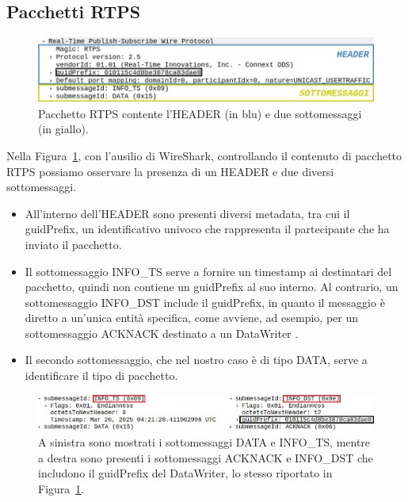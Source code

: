 \subsection{Pacchetti RTPS}


\begin{figure}[H]
    \centering
    \includegraphics[width=15.2cm, keepaspectratio]{img/Header e sottomessaggi esempio shapes2.jpg}
    \caption{Pacchetto RTPS contente l'HEADER (in blu) e due sottomessaggi (in giallo).}
    \label{headersubmessagedemo}
\end{figure}



Nella Figura~\ref{headersubmessagedemo}, con l'ausilio di WireShark,
controllando il contenuto di pacchetto RTPS possiamo osservare la presenza
di un HEADER e due diversi sottomessaggi. 
\begin{itemize}
    \item All'interno dell'HEADER sono presenti
    diversi metadata, tra cui il guidPrefix, un identificativo univoco che rappresenta
    il partecipante che ha inviato il pacchetto.
    \item Il sottomessaggio INFO\_TS serve a fornire un timestamp ai destinatari 
    del pacchetto,
    quindi non contiene un guidPrefix al 
    suo interno. Al contrario, un sottomessaggio INFO\_DST include
    il guidPrefix, in quanto il messaggio è diretto a un'unica
    entità specifica, come avviene, ad esempio, per un sottomessaggio ACKNACK
    destinato a un DataWriter \cite{rtiwireshark}.
    \item Il secondo sottomessaggio, che nel nostro caso è di tipo DATA,
    serve a identificare il tipo di pacchetto.
\end{itemize}
\begin{figure}[H]
    \centering
    \includegraphics[width=15.2cm, keepaspectratio]{img/Info_ts e info_DST-Pagina-3.jpg}
    \caption{A sinistra sono mostrati i sottomessaggi DATA e INFO\_TS, 
    mentre a destra sono presenti i sottomessaggi ACKNACK e INFO\_DST che
    includono 
    il guidPrefix del DataWriter, lo stesso riportato in 
    Figura~\ref{headersubmessagedemo}.}
    \label{Info_ts e info_DST}
\end{figure}



